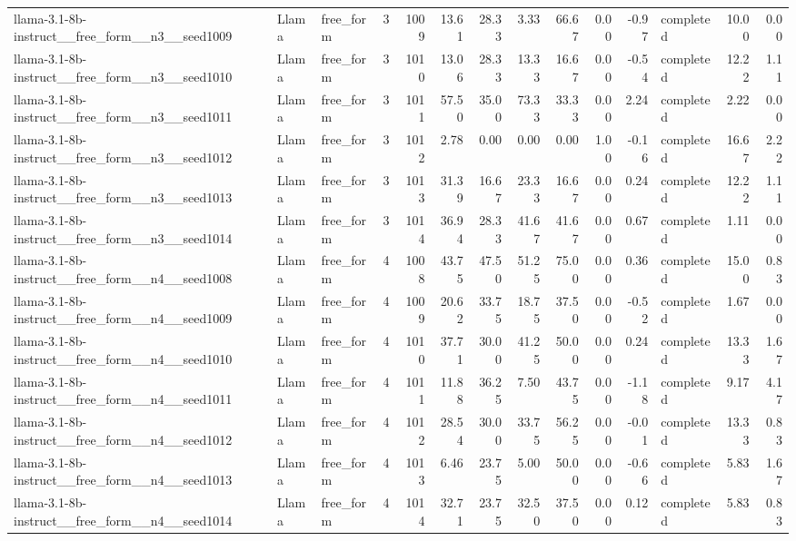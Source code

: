 \begin{longtable}{lllrrrrrrrrlrr}
llama-3.1-8b-instruct\_\_free\_form\_\_n3\_\_seed1009 & Llama & free\_form & 3 & 1009 & 13.61 & 28.33 & 3.33 & 66.67 & 0.00 & -0.97 & completed & 10.00 & 0.00 \\
llama-3.1-8b-instruct\_\_free\_form\_\_n3\_\_seed1010 & Llama & free\_form & 3 & 1010 & 13.06 & 28.33 & 13.33 & 16.67 & 0.00 & -0.54 & completed & 12.22 & 1.11 \\
llama-3.1-8b-instruct\_\_free\_form\_\_n3\_\_seed1011 & Llama & free\_form & 3 & 1011 & 57.50 & 35.00 & 73.33 & 33.33 & 0.00 & 2.24 & completed & 2.22 & 0.00 \\
llama-3.1-8b-instruct\_\_free\_form\_\_n3\_\_seed1012 & Llama & free\_form & 3 & 1012 & 2.78 & 0.00 & 0.00 & 0.00 & 1.00 & -0.16 & completed & 16.67 & 2.22 \\
llama-3.1-8b-instruct\_\_free\_form\_\_n3\_\_seed1013 & Llama & free\_form & 3 & 1013 & 31.39 & 16.67 & 23.33 & 16.67 & 0.00 & 0.24 & completed & 12.22 & 1.11 \\
llama-3.1-8b-instruct\_\_free\_form\_\_n3\_\_seed1014 & Llama & free\_form & 3 & 1014 & 36.94 & 28.33 & 41.67 & 41.67 & 0.00 & 0.67 & completed & 1.11 & 0.00 \\
llama-3.1-8b-instruct\_\_free\_form\_\_n4\_\_seed1008 & Llama & free\_form & 4 & 1008 & 43.75 & 47.50 & 51.25 & 75.00 & 0.00 & 0.36 & completed & 15.00 & 0.83 \\
llama-3.1-8b-instruct\_\_free\_form\_\_n4\_\_seed1009 & Llama & free\_form & 4 & 1009 & 20.62 & 33.75 & 18.75 & 37.50 & 0.00 & -0.52 & completed & 1.67 & 0.00 \\
llama-3.1-8b-instruct\_\_free\_form\_\_n4\_\_seed1010 & Llama & free\_form & 4 & 1010 & 37.71 & 30.00 & 41.25 & 50.00 & 0.00 & 0.24 & completed & 13.33 & 1.67 \\
llama-3.1-8b-instruct\_\_free\_form\_\_n4\_\_seed1011 & Llama & free\_form & 4 & 1011 & 11.88 & 36.25 & 7.50 & 43.75 & 0.00 & -1.18 & completed & 9.17 & 4.17 \\
llama-3.1-8b-instruct\_\_free\_form\_\_n4\_\_seed1012 & Llama & free\_form & 4 & 1012 & 28.54 & 30.00 & 33.75 & 56.25 & 0.00 & -0.01 & completed & 13.33 & 0.83 \\
llama-3.1-8b-instruct\_\_free\_form\_\_n4\_\_seed1013 & Llama & free\_form & 4 & 1013 & 6.46 & 23.75 & 5.00 & 50.00 & 0.00 & -0.66 & completed & 5.83 & 1.67 \\
llama-3.1-8b-instruct\_\_free\_form\_\_n4\_\_seed1014 & Llama & free\_form & 4 & 1014 & 32.71 & 23.75 & 32.50 & 37.50 & 0.00 & 0.12 & completed & 5.83 & 0.83 \\

\end{longtable}
